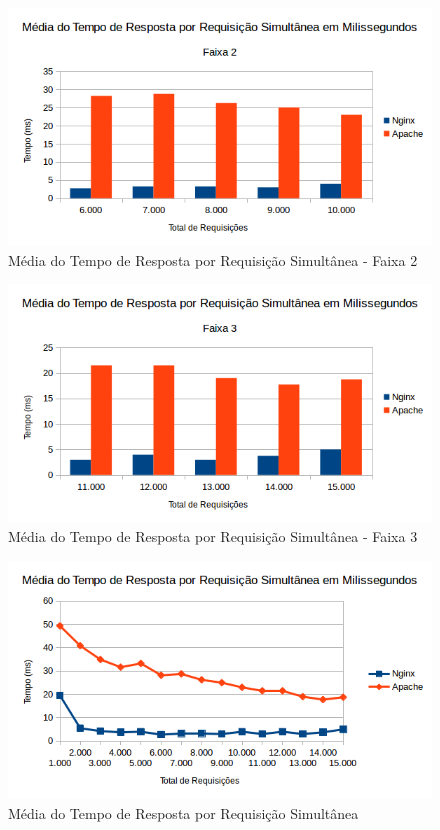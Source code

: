 \begin{figure}[H]
	\centering
	\includegraphics[width=1\linewidth]{graficos/grafico5-f2} 
	\caption{Média do Tempo de Resposta por Requisição Simultânea - Faixa 2}
	\label{fig:grafico5-f2}
\end{figure}

\begin{figure}[H]
	\centering
	\includegraphics[width=1\linewidth]{graficos/grafico5-f3} 
	\caption{Média do Tempo de Resposta por Requisição Simultânea - Faixa 3}
	\label{fig:grafico5-f3}
\end{figure}

\begin{figure}[H]
	\centering
	\includegraphics[width=1\linewidth]{graficos/grafico5} 
	\caption{Média do Tempo de Resposta por Requisição Simultânea}
	\label{fig:grafico5}
\end{figure}



